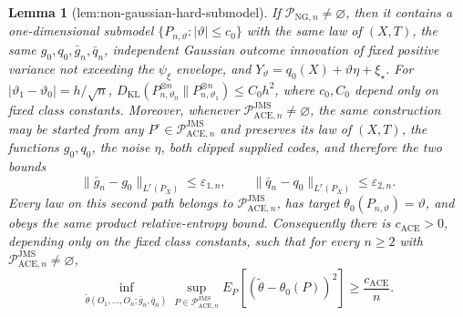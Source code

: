 \documentclass{article}
\newtheorem{lemma}{Lemma}
\begin{document}
\begin{lemma}[lem:non-gaussian-hard-submodel]\label{lem:non-gaussian-hard-submodel}
If \(\mathcal P_{\mathrm{NG},n}\neq\varnothing\), then it contains a one-dimensional submodel \(\{P_{n,\vartheta}:|\vartheta|\le c_0\}\) with the same law of \((X,T)\), the same \(g_0,q_0,\bar g_n,\bar q_n\), independent Gaussian outcome innovation of fixed positive variance not exceeding the \(\psi_{\xi}\) envelope, and \(Y_{\vartheta}=q_0(X)+\vartheta\eta+\xi_{\star}\). For \(|\vartheta_1-\vartheta_0|=h/\sqrt n\), \(D_{\mathrm{KL}}(P_{n,\vartheta_0}^{\otimes n}\|P_{n,\vartheta_1}^{\otimes n})\le C_0h^2\), where \(c_0,C_0\) depend only on fixed class constants. Moreover, whenever \(\mathcal P_{\mathrm{ACE},n}^{\mathrm{JMS}}\neq\varnothing\), the same construction may be started from any \(P^{\circ}\in\mathcal P_{\mathrm{ACE},n}^{\mathrm{JMS}}\) and preserves its law of \((X,T)\), the functions \(g_0,q_0\), the noise \(\eta\), both clipped supplied codes, and therefore the two bounds
\[
 \|\bar g_n-g_0\|_{L^r(P_X)}\le\varepsilon_{1,n},
 \qquad
 \|\bar q_n-q_0\|_{L^r(P_X)}\le\varepsilon_{2,n}.
\]
Every law on this second path belongs to \(\mathcal P_{\mathrm{ACE},n}^{\mathrm{JMS}}\), has target \(\theta_0(P_{n,\vartheta})=\vartheta\), and obeys the same product relative-entropy bound. Consequently there is \(c_{\mathrm{ACE}}>0\), depending only on the fixed class constants, such that for every \(n\ge2\) with \(\mathcal P_{\mathrm{ACE},n}^{\mathrm{JMS}}\neq\varnothing\),
\[
 \inf_{\widetilde\theta(O_1,\ldots,O_n;\bar g_n,\bar q_n)}
 \sup_{P\in\mathcal P_{\mathrm{ACE},n}^{\mathrm{JMS}}}
 E_P[(\widetilde\theta-\theta_0(P))^2]
 \ge \frac{c_{\mathrm{ACE}}}{n}.
\]
\end{lemma}
\end{document}
